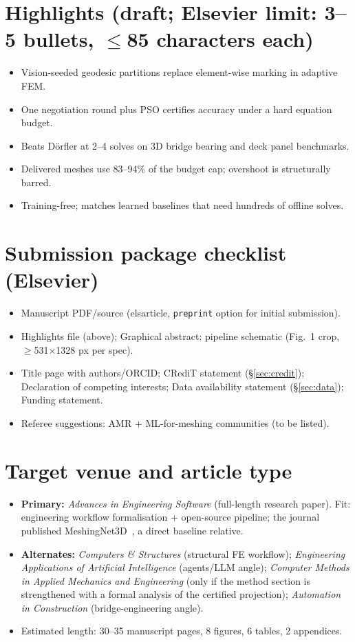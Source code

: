 \documentclass[preprint,12pt]{elsarticle}
\newenvironment{plan}{\begin{itemize}\setlength\itemsep{0.15em}}{\end{itemize}}
\begin{document}
\section*{Highlights (draft; Elsevier limit: 3--5 bullets, $\le$85 characters each)}
\begin{plan}
  \item Vision-seeded geodesic partitions replace element-wise marking in adaptive FEM.
  \item One negotiation round plus PSO certifies accuracy under a hard equation budget.
  \item Beats D\"orfler at 2--4 solves on 3D bridge bearing and deck panel benchmarks.
  \item Delivered meshes use 83--94\% of the budget cap; overshoot is structurally barred.
  \item Training-free; matches learned baselines that need hundreds of offline solves.
\end{plan}

\section*{Submission package checklist (Elsevier)}
\begin{plan}
  \item Manuscript PDF/source (elsarticle, \verb|preprint| option for initial submission).
  \item Highlights file (above); Graphical abstract: pipeline schematic (Fig.~1 crop,
        $\ge$531$\times$1328 px per spec).
  \item Title page with authors/ORCID; CRediT statement (\S\ref{sec:credit});
        Declaration of competing interests; Data availability statement
        (\S\ref{sec:data}); Funding statement.
  \item Referee suggestions: AMR + ML-for-meshing communities (to be listed).
\end{plan}

\section*{Target venue and article type}\label{sec:venue}
\begin{plan}
  \item \textbf{Primary:} \emph{Advances in Engineering Software} (full-length research
        paper). Fit: engineering workflow formalisation + open-source pipeline; the
        journal published MeshingNet3D~\cite{meshingnet3d}, a direct baseline relative.
  \item \textbf{Alternates:} \emph{Computers \& Structures} (structural FE workflow);
        \emph{Engineering Applications of Artificial Intelligence} (agents/LLM angle);
        \emph{Computer Methods in Applied Mechanics and Engineering} (only if the method
        section is strengthened with a formal analysis of the certified projection);
        \emph{Automation in Construction} (bridge-engineering angle).
  \item Estimated length: 30--35 manuscript pages, 8 figures, 6 tables, 2 appendices.
\end{plan}
\end{document}
